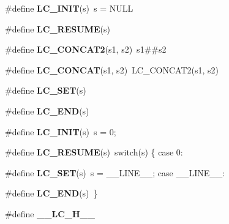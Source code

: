 \begin{DoxyCompactItemize}
\item 
\hypertarget{group__lc_ga2c1bb4fa6d7a6ff951a41c73fc721109}{
\#define {\bfseries LC\_\-INIT}(s)~s = NULL}
\label{group__lc_ga2c1bb4fa6d7a6ff951a41c73fc721109}

\item 
\#define {\bfseries LC\_\-RESUME}(s)
\item 
\hypertarget{group__lc_ga6e1e879e172e2d8838e5f567dac8918c}{
\#define {\bfseries LC\_\-CONCAT2}(s1, s2)~s1\#\#s2}
\label{group__lc_ga6e1e879e172e2d8838e5f567dac8918c}

\item 
\hypertarget{group__lc_ga2b1f9b9fe8b6895b156f0af10538971c}{
\#define {\bfseries LC\_\-CONCAT}(s1, s2)~LC\_\-CONCAT2(s1, s2)}
\label{group__lc_ga2b1f9b9fe8b6895b156f0af10538971c}

\item 
\#define {\bfseries LC\_\-SET}(s)
\item 
\hypertarget{group__lc_gaca51ceb2f5d855dfde55bcedf8d3b92d}{
\#define {\bfseries LC\_\-END}(s)}
\label{group__lc_gaca51ceb2f5d855dfde55bcedf8d3b92d}

\item 
\hypertarget{group__lc_ga2c1bb4fa6d7a6ff951a41c73fc721109}{
\#define {\bfseries LC\_\-INIT}(s)~s = 0;}
\label{group__lc_ga2c1bb4fa6d7a6ff951a41c73fc721109}

\item 
\hypertarget{group__lc_ga1ec8b8f4710dce1fa7fb87d3a31541ae}{
\#define {\bfseries LC\_\-RESUME}(s)~switch(s) \{ case 0:}
\label{group__lc_ga1ec8b8f4710dce1fa7fb87d3a31541ae}

\item 
\hypertarget{group__lc_gad8eec328a4868d767f0c00c8d1c6cfc1}{
\#define {\bfseries LC\_\-SET}(s)~s = \_\-\_\-LINE\_\-\_\-; case \_\-\_\-LINE\_\-\_\-:}
\label{group__lc_gad8eec328a4868d767f0c00c8d1c6cfc1}

\item 
\hypertarget{group__lc_gaca51ceb2f5d855dfde55bcedf8d3b92d}{
\#define {\bfseries LC\_\-END}(s)~\}}
\label{group__lc_gaca51ceb2f5d855dfde55bcedf8d3b92d}

\item 
\hypertarget{group__lc_ga28687499cf5b5681fb09ba1c184e09a8}{
\#define {\bfseries \_\-\_\-LC\_\-H\_\-\_\-}}
\label{group__lc_ga28687499cf5b5681fb09ba1c184e09a8}

\end{DoxyCompactItemize}

